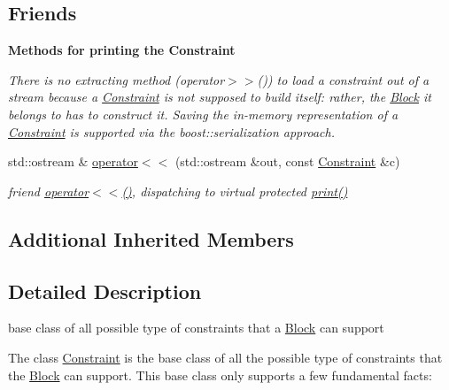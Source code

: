 \subsection*{Friends}
\begin{Indent}\textbf{ Methods for printing the Constraint}\par
{\em There is no extracting method (operator$>$$>$()) to load a constraint out of a stream because a \mbox{\hyperlink{class_s_m_spp__di__unipi__it_1_1_constraint}{Constraint}} is not supposed to build itself\+: rather, the \mbox{\hyperlink{class_s_m_spp__di__unipi__it_1_1_block}{Block}} it belongs to has to construct it. Saving the in-\/memory representation of a \mbox{\hyperlink{class_s_m_spp__di__unipi__it_1_1_constraint}{Constraint}} is supported via the boost\+::serialization approach. }\begin{DoxyCompactItemize}
\item 
std\+::ostream \& \mbox{\hyperlink{class_s_m_spp__di__unipi__it_1_1_constraint_a4f47f7bc7b271e73c2b4f89bf8f3e592}{operator$<$$<$}} (std\+::ostream \&out, const \mbox{\hyperlink{class_s_m_spp__di__unipi__it_1_1_constraint}{Constraint}} \&c)
\begin{DoxyCompactList}\small\item\em friend \mbox{\hyperlink{class_s_m_spp__di__unipi__it_1_1_constraint_a4f47f7bc7b271e73c2b4f89bf8f3e592}{operator$<$$<$()}}, dispatching to virtual protected \mbox{\hyperlink{class_s_m_spp__di__unipi__it_1_1_constraint_a2e7b9c9148a98c5c342e8c25cac95926}{print()}} \end{DoxyCompactList}\end{DoxyCompactItemize}
\end{Indent}
\subsection*{Additional Inherited Members}


\subsection{Detailed Description}
base class of all possible type of constraints that a \mbox{\hyperlink{class_s_m_spp__di__unipi__it_1_1_block}{Block}} can support 

The class \mbox{\hyperlink{class_s_m_spp__di__unipi__it_1_1_constraint}{Constraint}} is the base class of all the possible type of constraints that the \mbox{\hyperlink{class_s_m_spp__di__unipi__it_1_1_block}{Block}} can support. This base class only supports a few fundamental facts\+:


